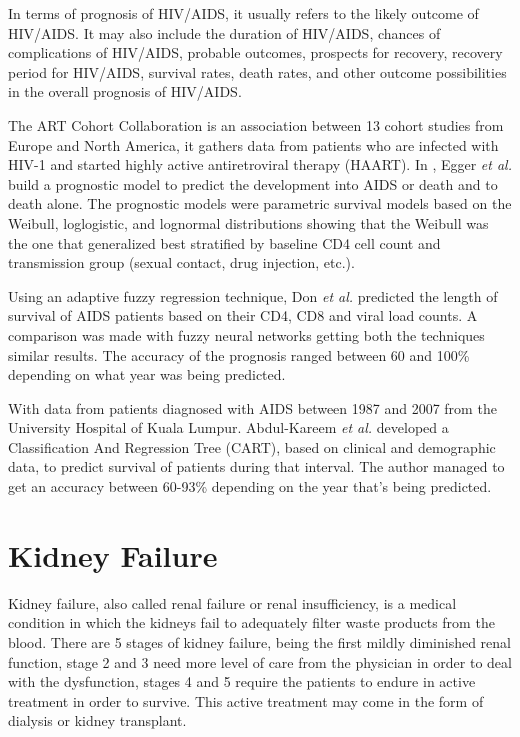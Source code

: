 In terms of prognosis of HIV/AIDS, it usually refers to the likely outcome of HIV/AIDS. It may also include the duration of HIV/AIDS, 
chances of complications of HIV/AIDS, probable outcomes, prospects for recovery, recovery period for HIV/AIDS, survival rates, death rates,
 and other outcome possibilities in the overall prognosis of HIV/AIDS. 

The ART Cohort Collaboration is an association between 13 cohort studies from Europe and North America, it gathers data from patients who
 are infected with HIV-1 and started highly active antiretroviral therapy (HAART). In \cite{Egger2002}, Egger \emph{et al.} build a prognostic
 model to predict the development into AIDS or death and to death alone. The prognostic models were parametric survival models based on the 
 Weibull, loglogistic, and lognormal distributions showing that the Weibull was the one that generalized best stratified by baseline CD4 cell
 count and transmission group (sexual contact, drug injection, etc.).

Using an adaptive fuzzy regression technique, Don \emph{et al.} predicted the length of survival of AIDS patients based on their CD4, CD8 and 
viral load counts. A comparison was made with fuzzy neural networks getting both the techniques similar results. The accuracy of the 
prognosis ranged between 60 and 100\% depending on what year was being predicted. \cite{Dom2009}

With data from patients diagnosed with AIDS between 1987 and 2007 from the University Hospital of Kuala Lumpur. Abdul-Kareem \emph{et al.} 
developed a Classification And Regression Tree (CART), based on clinical and demographic data, to predict survival of patients during
 that interval. The author managed to get an accuracy between 60-93\% depending on the year that’s being predicted.
 \cite{AbdulKareem2010}

 \section{Kidney Failure}
 \label{section:kidney}
 
Kidney failure, also called renal failure or renal insufficiency, is a medical condition in which the kidneys fail to adequately filter waste
 products from the blood. There are 5 stages of kidney failure, being the first mildly diminished renal function, stage 2 and 3 need more 
 level of care from the physician in order to deal with the dysfunction, stages 4 and 5 require the patients to endure in active treatment
 in order to survive. This active treatment may come in the form of dialysis or kidney transplant. 


